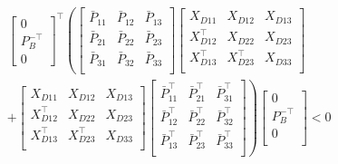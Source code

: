 \documentclass[journal]{IEEEtran}
\theoremstyle{innercustomthm}
\begin{document}
  {%
    \small
    \begin{equation*}
      \begin{split}
        &
        \begin{bmatrix}
          0 \\
          P_{B}^{-\top} \\
          0
        \end{bmatrix}^{\top}
        \left(
        \begin{bmatrix}
          \bar{P}_{11} & \bar{P}_{12} & \bar{P}_{13} \\
          \bar{P}_{21} & \bar{P}_{22} & \bar{P}_{23}\\
          \bar{P}_{31} & \bar{P}_{32} & \bar{P}_{33}\\
        \end{bmatrix}
        \right.
        \begin{bmatrix}
          X_{D11} & X_{D12} & X_{D13} \\
          X_{D12}^{\top} & X_{D22} & X_{D23} \\
          X_{D13}^{\top} & X_{D23}^{\top} & X_{D33} \\
        \end{bmatrix} \\
        &+
        \begin{bmatrix}
          X_{D11} & X_{D12} & X_{D13} \\
          X_{D12}^{\top} & X_{D22} & X_{D23} \\
          X_{D13}^{\top} & X_{D23}^{\top} & X_{D33} \\
        \end{bmatrix}
        \left.
        \begin{bmatrix}
          \bar{P}_{11}^{\top} & \bar{P}_{21}^{\top} & \bar{P}_{31}^{\top} \\
          \bar{P}_{12}^{\top} & \bar{P}_{22}^{\top} & \bar{P}_{32}^{\top}\\
          \bar{P}_{13}^{\top} & \bar{P}_{23}^{\top} & \bar{P}_{33}^{\top}\\
        \end{bmatrix}
        \right)
        \begin{bmatrix}
          0 \\
          P_{B}^{-\top} \\
          0 \\
        \end{bmatrix}
        < 0
      \end{split}
    \end{equation*}
  }%
\end{document}
